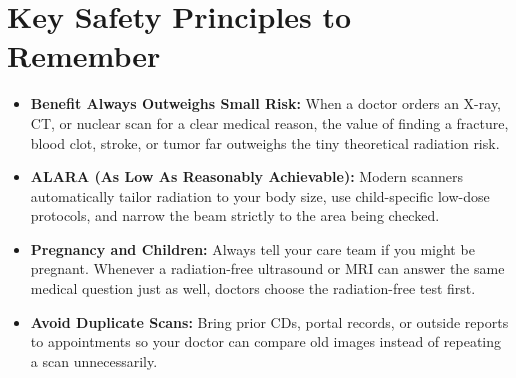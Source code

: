 \section{Key Safety Principles to Remember}
\begin{itemize}
  \item \textbf{Benefit Always Outweighs Small Risk:} When a doctor orders an X-ray, CT, or nuclear scan for a clear medical reason, the value of finding a fracture, blood clot, stroke, or tumor far outweighs the tiny theoretical radiation risk.
  \item \textbf{ALARA (As Low As Reasonably Achievable):} Modern scanners automatically tailor radiation to your body size, use child-specific low-dose protocols, and narrow the beam strictly to the area being checked.
  \item \textbf{Pregnancy and Children:} Always tell your care team if you might be pregnant. Whenever a radiation-free ultrasound or MRI can answer the same medical question just as well, doctors choose the radiation-free test first.
  \item \textbf{Avoid Duplicate Scans:} Bring prior CDs, portal records, or outside reports to appointments so your doctor can compare old images instead of repeating a scan unnecessarily.
\end{itemize}
